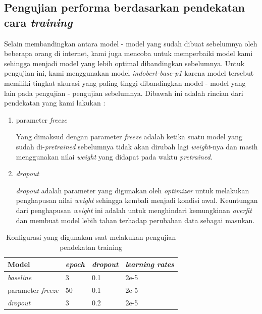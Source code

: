 \subsection{Pengujian performa berdasarkan pendekatan cara \textit{training}}

Selain membandingkan antara model - model yang sudah dibuat sebelumnya oleh beberapa orang di internet, kami juga mencoba untuk memperbaiki model kami sehingga menjadi model yang lebih optimal dibandingkan sebelumnya. Untuk pengujian ini, kami menggunakan model \textit{indobert-base-p1} karena model tersebut memiliki tingkat akurasi yang paling tinggi dibandingkan model - model yang lain pada pengujian - pengujian sebelumnya. Dibawah ini adalah rincian dari pendekatan yang kami lakukan :

\begin{enumerate}
    \item parameter \textit{freeze}

          Yang dimaksud dengan parameter \textit{freeze} adalah ketika suatu model yang sudah di-\textit{pretrained} sebelumnya tidak akan dirubah lagi \textit{weight}-nya dan masih menggunakan nilai \textit{weight} yang didapat pada waktu \textit{pretrained}.

    \item \textit{dropout}

          \textit{dropout} adalah parameter yang digunakan oleh \textit{optimizer} untuk melakukan penghapusan nilai \textit{weight} sehingga kembali menjadi kondisi awal. Keuntungan dari penghapusan \textit{weight} ini adalah untuk menghindari kemungkinan \textit{overfit} dan membuat model lebih tahan terhadap perubahan data sebagai masukan.
\end{enumerate}

\begin{table}[h]
    \centering
    \caption{Konfigurasi yang digunakan saat melakukan pengujian pendekatan training}
    \label{tab: training_config}
    \begin{tabular}{|l|l|l|l|}
        \hline
        \textbf{Model}            & \textit{\textbf{epoch}} & \textit{\textbf{dropout}} & \textit{\textbf{learning rates}} \\ \hline
        \textit{baseline}         & 3                       & 0.1                       & 2e-5                             \\ \hline
        parameter \textit{freeze} & 50                      & 0.1                       & 2e-5                             \\ \hline
        \textit{dropout}          & 3                       & 0.2                       & 2e-5                             \\ \hline
    \end{tabular}
\end{table}


